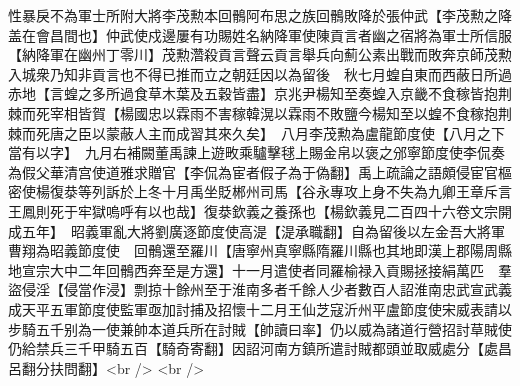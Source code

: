 性暴戾不為軍士所附大將李茂勲本回鶻阿布思之族回鶻敗降於張仲武【李茂勲之降盖在會昌間也】仲武使戍邊屢有功賜姓名納降軍使陳貢言者幽之宿將為軍士所信服【納降軍在幽州丁零川】茂勲濳殺貢言聲云貢言舉兵向薊公素出戰而敗奔京師茂勲入城衆乃知非貢言也不得已推而立之朝廷因以為留後　秋七月蝗自東而西蔽日所過赤地【言蝗之多所過食草木葉及五穀皆盡】京兆尹楊知至奏蝗入京畿不食稼皆抱荆棘而死宰相皆賀【楊國忠以霖雨不害稼韓滉以霖雨不敗鹽今楊知至以蝗不食稼抱荆棘而死唐之臣以蒙蔽人主而成習其來久矣】　八月李茂勲為盧龍節度使【八月之下當有以字】　九月右補闕董禹諫上遊畋乘驢擊毬上賜金帛以褒之邠寧節度使李侃奏為假父華清宫使道雅求贈官【李侃為宦者假子為于偽翻】禹上疏論之語頗侵宦官樞密使楊復㳟等列訴於上冬十月禹坐貶郴州司馬【谷永專攻上身不失為九卿王章斥言王鳳則死于牢獄嗚呼有以也哉】復㳟欽義之養孫也【楊欽義見二百四十六卷文宗開成五年】　昭義軍亂大將劉廣逐節度使高湜【湜承職翻】自為留後以左金吾大將軍曹翔為昭義節度使　回鶻還至羅川【唐寧州真寧縣隋羅川縣也其地即漢上郡陽周縣地宣宗大中二年回鶻西奔至是方還】十一月遣使者同羅榆禄入貢賜拯接絹萬匹　羣盜侵淫【侵當作浸】剽掠十餘州至于淮南多者千餘人少者數百人詔淮南忠武宣武義成天平五軍節度使監軍亟加討捕及招懷十二月王仙芝寇沂州平盧節度使宋威表請以步騎五千别為一使兼帥本道兵所在討賊【帥讀曰率】仍以威為諸道行營招討草賊使仍給禁兵三千甲騎五百【騎奇寄翻】因詔河南方鎮所遣討賊都頭並取威處分【處昌呂翻分扶問翻】<br />
<br />
